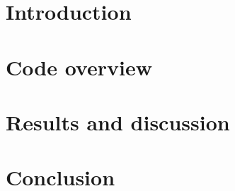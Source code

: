 \part{Introduction}


\newpage

\part{Code overview}


\newpage

\part{Results and discussion}



\newpage
\part{Conclusion}






